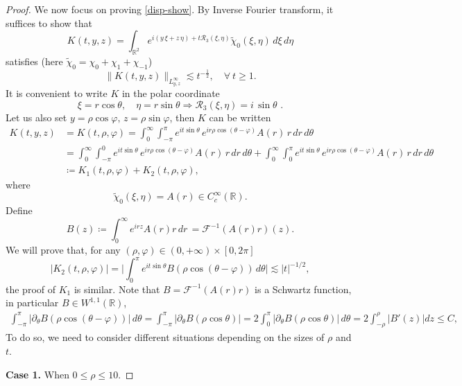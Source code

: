 \documentclass[11pt,reqno]{article}
\newcommand{\beq}{\begin{equation}}
\newcommand{\eeq}{\end{equation}}
\newcommand{\beqs}{\begin{equation*}}
\newcommand{\eeqs}{\end{equation*}}
\numberwithin{equation}{section}
\newcommand\R{{\mathbb R}}
\newcommand \tri {\coloneqq}
\begin{document}
\begin{appendices}
\begin{proof}
	We now focus on proving \eqref{disp-show}. By Inverse Fourier transform, it suffices to show that
	\[
	K(t, y,z) = \int_{\mathbb{R}^2} e^{i  (y\,\xi + z\,\eta) + t \mathcal{R}_3(\xi, \eta)} \tilde{\chi}_0(\xi, \eta) \, d\xi \, d\eta
	\]
	satisfies (here $ \tilde{\chi}_0={\chi}_0+{\chi}_1+{\chi}_{-1}$)
	\[
	\| K(t,y,z) \|_{L^\infty_{y,z}} \lesssim t^{-\frac{1}{2}}, \quad \forall~ t\geq 1.
	\]
	It is convenient to write $K$ in the polar coordinate
	\[
	\xi = r \cos \theta, \quad \eta = r \sin \theta \Rightarrow \mathcal{R}_3(\xi, \eta) = i\,\sin \theta\,\,.
	\]
	Let us also set \( y = \rho \cos \varphi, \, z = \rho \sin \varphi \), then $K$ can be written
	\begin{align*}
		K(t,y,z)&=K(t,\rho,\varphi) 
		= \int_0^\infty \int_{-\pi}^{\pi} e^{i t \sin \theta} \, e^{i r  %
			\rho \cos (\theta-\varphi)} A(r) \, r \, dr \, d\theta\\
		&=\int_0^\infty \int_{-\pi}^{0} e^{i t \sin \theta} \, e^{i r  \rho \cos (\theta-\varphi)} A(r) \, r \, dr \, d\theta+\int_0^\infty \int_{0}^{\pi} e^{i t \sin \theta} \, e^{i r  \rho \cos (\theta-\varphi)} A(r) \, r \, dr \, d\theta\\
		&\tri  K_{1}(t, \rho, \varphi)+K_{2}(t,\rho, \varphi),
	\end{align*}
	where 
	\beqs
	\tilde{\chi}_0(\xi,\eta)= A(r) \in  C_c^{\infty}(\mathbb{R}).
	\eeqs
	Define
	\[
	B(z) \tri \int_0^\infty e^{i r  z} A(r) r \, dr\,=\mathcal{F}^{-1}(A(r) r)(z).
	\]
	We will prove that, %
    for any $(\rho,\varphi)\in (0,+\infty)\times [0,2\pi]$
	\beq\label{es-K2}
	|K_2(t, \rho,\varphi)|=\bigg|\int_{0}^{\pi} e^{it \sin\theta}B(\rho \cos (\theta-\varphi))\, d\theta\bigg| \lesssim |t|^{-1/2},
	\eeq
	the proof of $K_1$ is similar. Note that $B=\mathcal{F}^{-1}(A(r) r)$ is a Schwartz function, in particular $B\in W^{1,1}(\R)$,
\begin{align*}
		\int_{-\pi}^{\pi} |\partial_{\theta}B(\rho \cos (\theta-\varphi))|\, d\theta=\int_{-\pi}^{\pi} |\partial_{\theta}B(\rho \cos \theta)|=2\int_{0}^{\pi} |\partial_{\theta}B(\rho \cos \theta)|\, d\theta=2\int_{-\rho}^{\rho}|B'(z)|dz\leq C, 
	\end{align*}
    To do so, we need to consider different situations depending on the sizes of $\rho$ and $t.$
	
	\textbf{Case 1.} When \( 0\leq \rho \leq 10 \). 
	

\end{proof}
\end{appendices}
\end{document}
